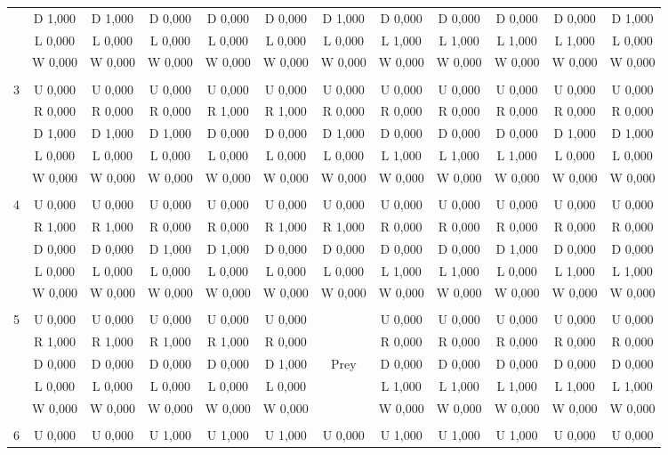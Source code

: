 \begin{table}[htbp]
\begin{tiny}
\begin{tabular}{c|c|c|c|c|c|c|c|c|c|c|c|}
&D 1,000&D 1,000&D 0,000&D 0,000&D 0,000&D 1,000&D 0,000&D 0,000&D 0,000&D 0,000&D 1,000\\
&L 0,000&L 0,000&L 0,000&L 0,000&L 0,000&L 0,000&L 1,000&L 1,000&L 1,000&L 1,000&L 0,000\\
&W 0,000&W 0,000&W 0,000&W 0,000&W 0,000&W 0,000&W 0,000&W 0,000&W 0,000&W 0,000&W 0,000\\
\hline \\
3&U 0,000&U 0,000&U 0,000&U 0,000&U 0,000&U 0,000&U 0,000&U 0,000&U 0,000&U 0,000&U 0,000\\
&R 0,000&R 0,000&R 0,000&R 1,000&R 1,000&R 0,000&R 0,000&R 0,000&R 0,000&R 0,000&R 0,000\\
&D 1,000&D 1,000&D 1,000&D 0,000&D 0,000&D 1,000&D 0,000&D 0,000&D 0,000&D 1,000&D 1,000\\
&L 0,000&L 0,000&L 0,000&L 0,000&L 0,000&L 0,000&L 1,000&L 1,000&L 1,000&L 0,000&L 0,000\\
&W 0,000&W 0,000&W 0,000&W 0,000&W 0,000&W 0,000&W 0,000&W 0,000&W 0,000&W 0,000&W 0,000\\
\hline \\
4&U 0,000&U 0,000&U 0,000&U 0,000&U 0,000&U 0,000&U 0,000&U 0,000&U 0,000&U 0,000&U 0,000\\
&R 1,000&R 1,000&R 0,000&R 0,000&R 1,000&R 1,000&R 0,000&R 0,000&R 0,000&R 0,000&R 0,000\\
&D 0,000&D 0,000&D 1,000&D 1,000&D 0,000&D 0,000&D 0,000&D 0,000&D 1,000&D 0,000&D 0,000\\
&L 0,000&L 0,000&L 0,000&L 0,000&L 0,000&L 0,000&L 1,000&L 1,000&L 0,000&L 1,000&L 1,000\\
&W 0,000&W 0,000&W 0,000&W 0,000&W 0,000&W 0,000&W 0,000&W 0,000&W 0,000&W 0,000&W 0,000\\
\hline \\
5&U 0,000&U 0,000&U 0,000&U 0,000&U 0,000&&U 0,000&U 0,000&U 0,000&U 0,000&U 0,000\\
&R 1,000&R 1,000&R 1,000&R 1,000&R 0,000&&R 0,000&R 0,000&R 0,000&R 0,000&R 0,000\\
&D 0,000&D 0,000&D 0,000&D 0,000&D 1,000&Prey&D 0,000&D 0,000&D 0,000&D 0,000&D 0,000\\
&L 0,000&L 0,000&L 0,000&L 0,000&L 0,000&&L 1,000&L 1,000&L 1,000&L 1,000&L 1,000\\
&W 0,000&W 0,000&W 0,000&W 0,000&W 0,000&&W 0,000&W 0,000&W 0,000&W 0,000&W 0,000\\
\hline \\
6&U 0,000&U 0,000&U 1,000&U 1,000&U 1,000&U 0,000&U 1,000&U 1,000&U 1,000&U 0,000&U 0,000\\

\end{tabular}
\end{tiny}
\end{table}

